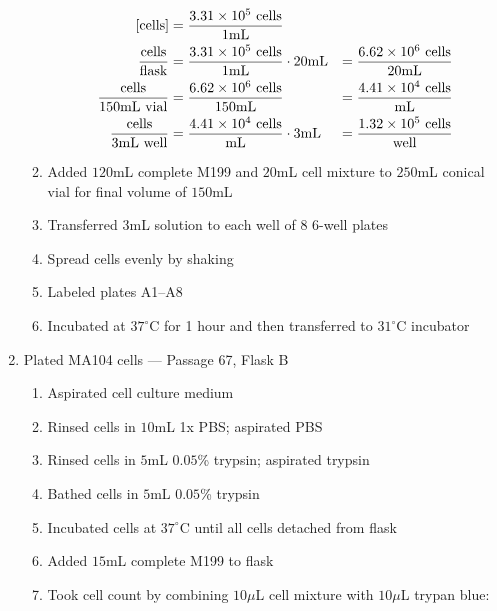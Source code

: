 \begin{enumerate}
\begin{enumerate}
				\begin{align*}
				\text{[cells]} &= \frac{3.31\times 10^{5}\text{ cells}}{1\text{mL}} \\
				\frac{\text{cells}}{\text{flask}} &= \frac{3.31\times 10^{5}\text{ cells}}{1\text{mL}} \cdot 20\text{mL} &= \frac{6.62\times 10^{6}\text{ cells}}{20\text{mL}}\\
				\frac{\text{cells}}{150\text{mL vial}} &= \frac{6.62\times 10^{6}\text{ cells}}{150\text{mL}} &= \frac{4.41\times 10^{4}\text{ cells}}{\text{mL}}\\
				\frac{\text{cells}}{3\text{mL well}} &= \frac{4.41\times 10^{4}\text{ cells}}{\text{mL}} \cdot 3\text{mL} &= \frac{1.32\times 10^{5}\text{ cells}}{\text{well}}\\
				\end{align*}
			\item Added $120$mL complete M199 and $20$mL cell mixture to $250$mL conical vial for final volume of $150$mL
			\item Transferred $3$mL solution to each well of 8 6-well plates
			\item Spread cells evenly by shaking
			\item Labeled plates A1--A8
			\item Incubated at $37^{\circ}$C for 1 hour and then transferred to $31^{\circ}$C incubator
		\end{enumerate}
	\item Plated MA104 cells --- Passage 67, Flask B
		\begin{enumerate}
			\item Aspirated cell culture medium
			\item Rinsed cells in $10$mL 1x PBS; aspirated PBS
			\item Rinsed cells in $5$mL $0.05$\% trypsin; aspirated trypsin
			\item Bathed cells in $5$mL $0.05$\% trypsin
			\item Incubated cells at $37^{\circ}$C until all cells detached from flask
			\item Added $15$mL complete M199 to flask
			\item Took cell count by combining $10\mu$L cell mixture with $10\mu$L trypan blue:
			

\end{enumerate}
\end{enumerate}

